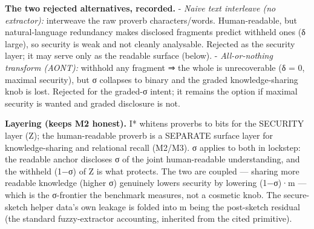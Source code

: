 \documentclass[
  11pt,
]{article}
\begin{document}
\textbf{The two rejected alternatives, recorded.} - \emph{Naive text
interleave (no extractor):} interweave the raw proverb characters/words.
Human-readable, but natural-language redundancy makes disclosed
fragments predict withheld ones (δ large), so security is weak and not
cleanly analysable. Rejected as the security layer; it may serve only as
the readable surface (below). - \emph{All-or-nothing transform (AONT):}
withhold any fragment ⇒ the whole is unrecoverable (δ = 0, maximal
security), but σ collapses to binary and the graded knowledge-sharing
knob is lost. Rejected for the graded-σ intent; it remains the option if
maximal security is wanted and graded disclosure is not.

\textbf{Layering (keeps M2 honest).} I* whitens proverbs to bits for the
SECURITY layer (Z); the human-readable proverb is a SEPARATE surface
layer for knowledge-sharing and relational recall (M2/M3). σ applies to
both in lockstep: the readable anchor discloses σ of the joint
human-readable understanding, and the withheld (1−σ) of Z is what
protects. The two are coupled --- sharing more readable knowledge
(higher σ) genuinely lowers security by lowering (1−σ)·m --- which is
the σ-frontier the benchmark measures, not a cosmetic knob. The
secure-sketch helper data's own leakage is folded into m being the
post-sketch residual (the standard fuzzy-extractor accounting, inherited
from the cited primitive).
\end{document}
